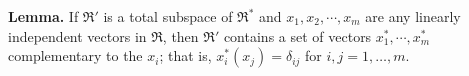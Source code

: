 \textbf{Lemma.} If $\mathfrak{R}'$ is a total subspace of $\mathfrak{R}^*$ and $x_1, x_2, \cdots, x_m$ are any linearly independent vectors in $\mathfrak{R}$, then $\mathfrak{R}'$ contains a set of vectors $x_1^*, \cdots, x_m^*$ complementary to the $x_i$; that is, $x_i^*(x_j) = \delta_{ij}$ for $i, j = 1, \ldots, m$.
